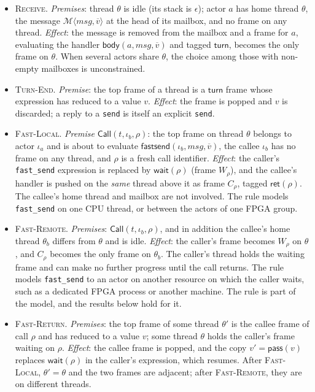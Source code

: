 \documentclass[11pt]{article}
\theoremstyle{definition}
\theoremstyle{remark}
\newcommand{\fs}{\texttt{fast\_send}}
\newcommand{\snd}{\texttt{send}}
\newcommand{\Msg}[1]{\mathcal{M}\langle #1\rangle}
\newcommand{\turn}{\mathsf{turn}}
\newcommand{\ret}[1]{\mathsf{ret}(#1)}
\newcommand{\wait}[1]{\mathsf{wait}(#1)}
\newcommand{\fsend}{\mathsf{fastsend}}
\newcommand{\body}{\mathsf{body}}
\newcommand{\pass}{\mathsf{pass}}
\begin{document}
\begin{itemize}[leftmargin=1.4em]
  \item \textsc{Receive}. \emph{Premises}: thread $\theta$ is idle (its stack is
  $\epsilon$); actor $a$ has home thread $\theta$, the message $\Msg{msg,\overline{v}}$
  at the head of its mailbox, and no frame on any thread. \emph{Effect}: the message is
  removed from the mailbox and a frame for $a$, evaluating the handler
  $\body(a,msg,\overline{v})$ and tagged $\turn$, becomes the only frame on $\theta$. When
  several actors share $\theta$, the choice among those with non-empty mailboxes is
  unconstrained.
  \item \textsc{Turn-End}. \emph{Premise}: the top frame of a thread is a $\turn$ frame
  whose expression has reduced to a value $v$. \emph{Effect}: the frame is popped and $v$
  is discarded; a reply to a \snd{} is itself an explicit \snd{}.
  \item \textsc{Fast-Local}. \emph{Premise} $\mathsf{Call}(t,\iota_b,\rho)$: the top frame
  on thread $\theta$ belongs to actor $\iota_a$ and is about to evaluate
  $\fsend(\iota_b,msg,\overline{v})$, the callee $\iota_b$ has no frame on any thread, and
  $\rho$ is a fresh call identifier. \emph{Effect}: the caller's \fs{} expression is
  replaced by $\wait{\rho}$ (frame $W_\rho$), and the callee's handler is pushed on the
  \emph{same} thread above it as frame $C_\rho$, tagged $\ret{\rho}$. The callee's home
  thread and mailbox are not involved. The rule models \fs{} on one CPU thread, or
  between the actors of one FPGA group.
  \item \textsc{Fast-Remote}. \emph{Premises}: $\mathsf{Call}(t,\iota_b,\rho)$, and in
  addition the callee's home thread $\theta_b$ differs from $\theta$ and is idle.
  \emph{Effect}: the caller's frame becomes $W_\rho$ on $\theta$, and $C_\rho$ becomes the
  only frame on $\theta_b$. The caller's thread holds the waiting frame and can make no
  further progress until the call returns. The rule models \fs{} to an actor on another
  resource on which the caller waits, such as a dedicated FPGA process or another
  machine. The rule is part of the model,
  and the results below hold for it.
  \item \textsc{Fast-Return}. \emph{Premises}: the top frame of some thread $\theta'$ is
  the callee frame of call $\rho$ and has reduced to a value $v$; some thread $\theta$
  holds the caller's frame waiting on $\rho$. \emph{Effect}: the callee frame is popped,
  and the copy $v' = \pass(v)$ replaces $\wait{\rho}$ in the caller's expression, which
  resumes. After \textsc{Fast-Local}, $\theta' = \theta$ and the two frames are
  adjacent; after \textsc{Fast-Remote}, they are on different threads.
\end{itemize}
\end{document}
